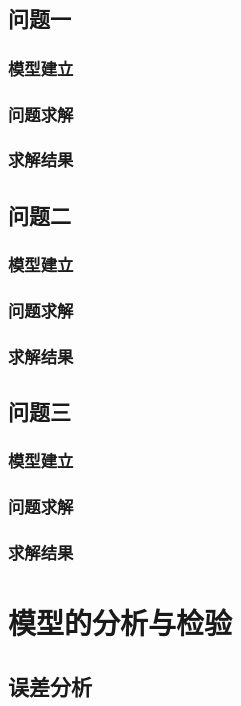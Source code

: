 \documentclass[withoutpreface,bwprint]{cumcmthesis} %
\begin{document}
\subsection{问题一}
\subsubsection{模型建立}
\subsubsection{问题求解}
\subsubsection{求解结果}

\subsection{问题二}
\subsubsection{模型建立}
\subsubsection{问题求解}
\subsubsection{求解结果}

\subsection{问题三}
\subsubsection{模型建立}
\subsubsection{问题求解}
\subsubsection{求解结果}

\section{模型的分析与检验}
\subsection{误差分析}
\end{document}

